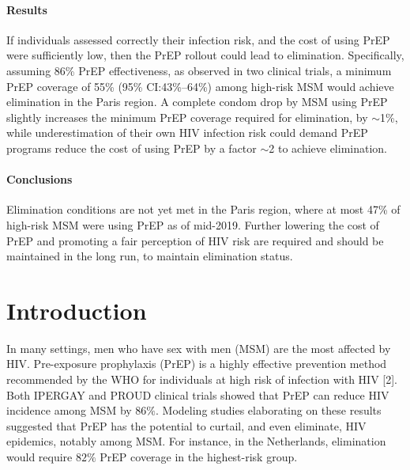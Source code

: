 \documentclass[preprint,review,12pt]{article}			%
\begin{document}
\paragraph{Results}
If individuals assessed correctly their infection risk, and the cost of using PrEP were sufficiently low, then the PrEP rollout could lead to elimination. Specifically, assuming 86\% PrEP effectiveness, as observed in two clinical trials, a minimum PrEP coverage of 55\% (95\% CI:43\%--64\%) among high-risk MSM would achieve elimination in the Paris region. A complete condom drop by MSM using PrEP slightly increases the minimum PrEP coverage required for elimination, by $\sim$1\%, while underestimation of their own HIV infection risk could demand PrEP programs reduce the cost of using PrEP by a factor $\sim$2 to achieve elimination.  
 
\paragraph{Conclusions}
Elimination conditions are not yet met in the Paris region, where at most 47\% of high-risk MSM were using PrEP as of mid-2019. Further lowering the cost of PrEP and promoting a fair perception of HIV risk are required and should be maintained in the long run, to maintain elimination status.

%
%
% 


\linenumbers
\modulolinenumbers[5]



\section{Introduction} \label{sec:Intro}

In many settings, men who have sex with men (MSM) are the most affected by HIV.\cite{Beyrer2016} Pre-exposure prophylaxis (PrEP) is a highly effective prevention method recommended by the WHO for individuals at high risk of infection with HIV [2]. Both IPERGAY and PROUD clinical trials showed that PrEP can reduce HIV incidence among MSM by $86\%$.\cite{Molina2015,McCormack2016} Modeling studies elaborating on these results suggested that PrEP has the potential to curtail, and even eliminate, HIV epidemics, notably among MSM.\cite{Jenness2016,Rozhnova2018,Hansson2020,Scott2018} For instance, in the Netherlands, elimination would require $82\%$ PrEP coverage in the highest-risk group. %
\end{document}
